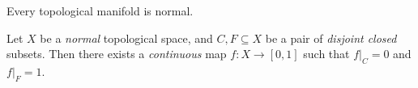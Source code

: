 \begin{corollary}
    \label{cor:manifold-is-normal}
    Every topological manifold is normal.
\end{corollary}

\begin{theorem}[Urysohn]
    \label{thm:urysohn}
    Let \(X\) be a \emph{normal} topological space, and \(C, F \subseteq X\) be a
    pair of \emph{disjoint closed} subsets. Then there exists a \emph{continuous}
    map \(f: X \to [0, 1]\) such that \(f|_C = 0\) and \(f|_F = 1\).
\end{theorem}

